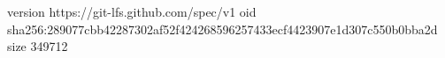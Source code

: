version https://git-lfs.github.com/spec/v1
oid sha256:289077cbb42287302af52f424268596257433ecf4423907e1d307c550b0bba2d
size 349712
